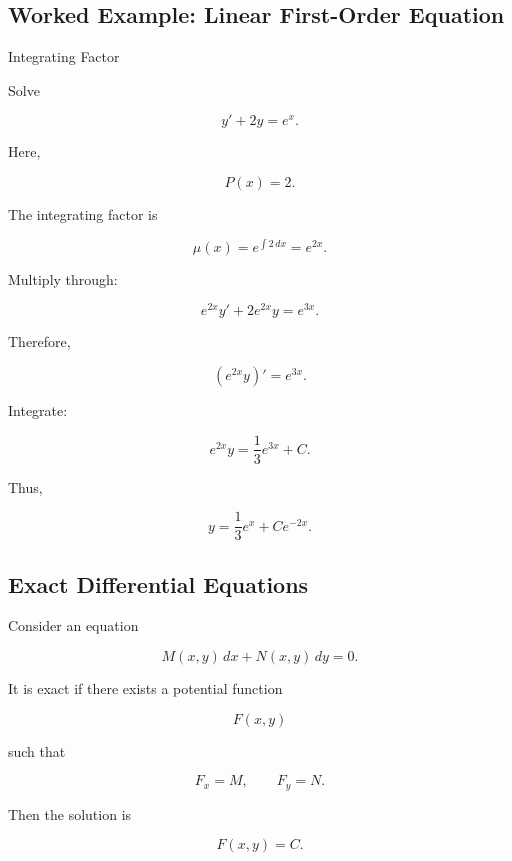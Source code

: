\subsection{Worked Example: Linear First-Order Equation}
\label{subsec:worked-linear-first-order}

\begin{workedexamplebox}{Integrating Factor}

Solve

\[
y'+2y=e^x.
\]

Here,

\[
P(x)=2.
\]

The integrating factor is

\[
\mu(x)
=
e^{\int2\,dx}
=
e^{2x}.
\]

Multiply through:

\[
e^{2x}y'
+
2e^{2x}y
=
e^{3x}.
\]

Therefore,

\[
(e^{2x}y)'
=
e^{3x}.
\]

Integrate:

\[
e^{2x}y
=
\frac13e^{3x}
+
C.
\]

Thus,

\begin{answerbox}
\[
\boxed{
y
=
\frac13e^x
+
Ce^{-2x}.
}
\]
\end{answerbox}

\end{workedexamplebox}

\subsection{Exact Differential Equations}
\label{subsec:exact-differential-equations}

Consider an equation

\[
\boxed{
M(x,y)\,dx
+
N(x,y)\,dy
=
0.
}
\]

It is exact if there exists a potential function

\[
F(x,y)
\]

such that

\[
\boxed{
F_x=M,
\qquad
F_y=N.
}
\]

Then the solution is

\[
\boxed{
F(x,y)=C.
}
\]

